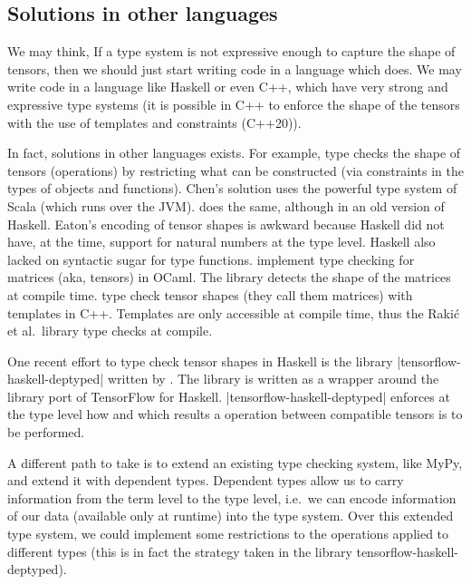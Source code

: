 \subsection{Solutions in other languages}%
\label{solutions-in-other-languages}

We may think, If a type system is not expressive enough to capture the
shape of tensors, then we should just start writing code in a language
which does. We may write code in a language like Haskell or even C++,
which have very strong and expressive type systems (it is possible in
C++ to enforce the shape of the tensors with the use of templates and
constraints (C++20)).

In fact, solutions in other languages exists. For example,
\textcite{chen_typesafe_2017} type checks the shape of tensors
(operations) by restricting what can be constructed (via constraints in
the types of objects and functions). Chen's solution uses the powerful
type system of Scala (which runs over the JVM).
\textcite{eaton_statically_2006} does the same, although in an old
version of Haskell. Eaton's encoding of tensor shapes is awkward because
Haskell did not have, at the time, support for natural numbers at the
type level. Haskell also lacked on syntactic sugar for type functions.
\textcite{abe_simple_2015} implement type checking for matrices (aka,
tensors) in OCaml. The library detects the shape of the matrices at
compile time. \textcite{rakic_statically_2012} type check tensor shapes
(they call them matrices) with templates in C++. Templates are only
accessible at compile time, thus the Rakić et al.~library type checks at
compile.

One recent effort to type check tensor shapes in Haskell is the library
\pycode|tensorflow-haskell-deptyped| written by
\textcite{elkin_haskell_2018}. The library is written as a wrapper
around the library port of TensorFlow for Haskell.
\pycode|tensorflow-haskell-deptyped| enforces at the type level how and
which results a operation between compatible tensors is to be performed.

A different path to take is to extend an existing type checking system,
like MyPy, and extend it with dependent types. Dependent types allow us
to carry information from the term level to the type level, i.e.~we can
encode information of our data (available only at runtime) into the type
system. Over this extended type system, we could implement some
restrictions to the operations applied to different types (this is in
fact the strategy taken in the library tensorflow-haskell-deptyped).

